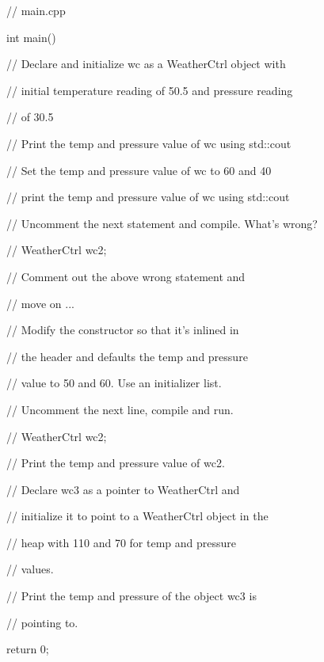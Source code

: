 \begin{consolethree}[escapeinside=||]

// main.cpp

int main()

{

// Declare and initialize wc as a WeatherCtrl object with

// initial temperature reading of 50.5 and pressure reading

// of 30.5



// Print the temp and pressure value of wc using std::cout



// Set the temp and pressure value of wc to 60 and 40



// print the temp and pressure value of wc using std::cout



// Uncomment the next statement and compile. What's wrong?

// WeatherCtrl wc2;



// Comment out the above wrong statement and

// move on ...



// Modify the constructor so that it's inlined in

// the header and defaults the temp and pressure

// value to 50 and 60. Use an initializer list.



// Uncomment the next line, compile and run.

// WeatherCtrl wc2;



// Print the temp and pressure value of wc2.



// Declare wc3 as a pointer to WeatherCtrl and

// initialize it to point to a WeatherCtrl object in the

// heap with 110 and 70 for temp and pressure

// values.

// Print the temp and pressure of the object wc3 is

// pointing to.



    return 0;

}

\end{consolethree}

